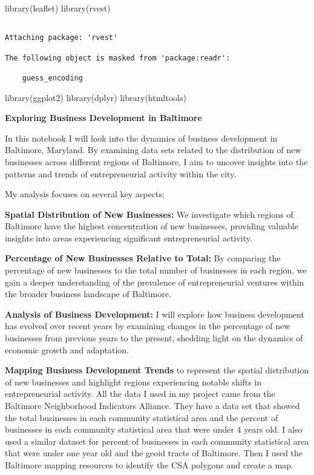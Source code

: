 \documentclass[
  letterpaper,
  DIV=11,
  numbers=noendperiod]{scrartcl}
\newenvironment{Shaded}{\begin{snugshade}}{\end{snugshade}}
\newcommand{\FunctionTok}[1]{\textcolor[rgb]{0.28,0.35,0.67}{#1}}
\newcommand{\NormalTok}[1]{\textcolor[rgb]{0.00,0.23,0.31}{#1}}
\begin{document}
\begin{Shaded}
\begin{Highlighting}[]
\FunctionTok{library}\NormalTok{(leaflet)}
\FunctionTok{library}\NormalTok{(rvest)}
\end{Highlighting}
\end{Shaded}

\begin{verbatim}

Attaching package: 'rvest'

The following object is masked from 'package:readr':

    guess_encoding
\end{verbatim}

\begin{Shaded}
\begin{Highlighting}[]
\FunctionTok{library}\NormalTok{(ggplot2)}
\FunctionTok{library}\NormalTok{(dplyr)}
\FunctionTok{library}\NormalTok{(htmltools)}
\end{Highlighting}
\end{Shaded}

\textbf{Exploring Business Development in Baltimore}

In this notebook I will look into the dynamics of business development
in Baltimore, Maryland. By examining data sets related to the
distribution of new businesses across different regions of Baltimore, I
aim to uncover insights into the patterns and trends of entrepreneurial
activity within the city.

My analysis focuses on several key aspects:

\textbf{Spatial Distribution of New Businesses:} We investigate which
regions of Baltimore have the highest concentration of new businesses,
providing valuable insights into areas experiencing significant
entrepreneurial activity.

\textbf{Percentage of New Businesses Relative to Total:} By comparing
the percentage of new businesses to the total number of businesses in
each region, we gain a deeper understanding of the prevalence of
entrepreneurial ventures within the broader business landscape of
Baltimore.

\textbf{Analysis of Business Development:} I will explore how business
development has evolved over recent years by examining changes in the
percentage of new businesses from previous years to the present,
shedding light on the dynamics of economic growth and adaptation.

\textbf{Mapping Business Development Trends} to represent the spatial
distribution of new businesses and highlight regions experiencing
notable shifts in entrepreneurial activity. All the data I used in my
project came from the Baltimore Neighborhood Indicators Alliance. They
have a data set that showed the total businesses in each community
statistical area and the percent of businesses in each community
statistical area that were under 4 years old. I also used a similar
dataset for percent of businesses in each community statistical area
that were under one year old and the geoid tracts of Baltimore. Then I
used the Baltimore mapping resources to identify the CSA polygons and
create a map.
\end{document}
